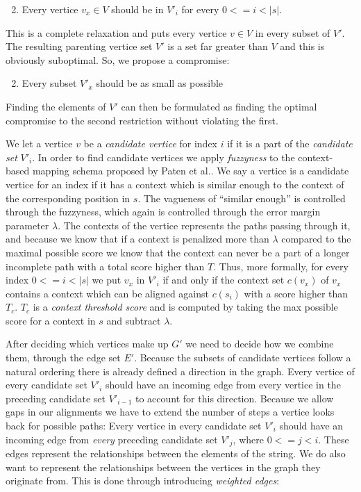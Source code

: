\documentclass[thesis.tex]{subfiles}
\begin{document}
\begin{enumerate}
  \setcounter{enumi}{1}
  \item Every vertice $v_x \in V$ should be in $V'_i$ for every $0<=i<|s|$.
\end{enumerate}
This is a complete relaxation and puts every vertice $v \in V$ in every subset of $V'$. The resulting parenting vertice set $V'$ is a set far greater than $V$ and this is obviously suboptimal. So, we propose a compromise:
\begin{enumerate}
  \setcounter{enumi}{1}
  \item Every subset $V'_x$ should be as small as possible
\end{enumerate}
Finding the elements of $V'$ can then be formulated as finding the optimal compromise to the second restriction without violating the first.\\
\par\noindent
We let a vertice $v$ be a \textit{candidate vertice} for index $i$ if it is a part of the \textit{candidate set} $V'_i$. In order to find candidate vertices we apply \textit{fuzzyness} to the context-based mapping schema proposed by Paten et al.\cite{mapping_to_a_reference_genome_structure}. We say a vertice is a candidate vertice for an index if it has a context which is similar enough to the context of the corresponding position in $s$. The vagueness of ``similar enough'' is controlled through the fuzzyness, which again is controlled through the error margin parameter $\lambda$. The contexts of the vertice represents the paths passing through it, and because we know that if a context is penalized more than $\lambda$ compared to the maximal possible score we know that the context can never be a part of a longer incomplete path with a total score higher than $T$. Thus, more formally, for every index $0<=i<|s|$ we put $v_x$ in $V'_i$ if and only if the context set $c(v_x)$ of $v_x$ contains a context which can be aligned against $c(s_i)$ with a score higher than $T_c$. $T_c$ is a \textit{context threshold score} and is computed by taking the max possible score for a context in $s$ and subtract $\lambda$.\\
\par\noindent
After deciding which vertices make up $G'$ we need to decide how we combine them, through the edge set $E'$. Because the subsets of candidate vertices follow a natural ordering there is already defined a direction in the graph. Every vertice of every candidate set $V'_i$ should have an incoming edge from every vertice in the preceding candidate set $V'_{i-1}$ to account for this direction. Because we allow gaps in our alignments we have to extend the number of steps a vertice looks back for possible paths: Every vertice in every candidate set $V'_i$ should have an incoming edge from \textit{every} preceding candidate set $V'_{j}$, where $0<=j<i$. These edges represent the relationships between the elements of the string. We do also want to represent the relationships between the vertices in the graph they originate from. This is done through introducing \textit{weighted edges}:
\end{document}
